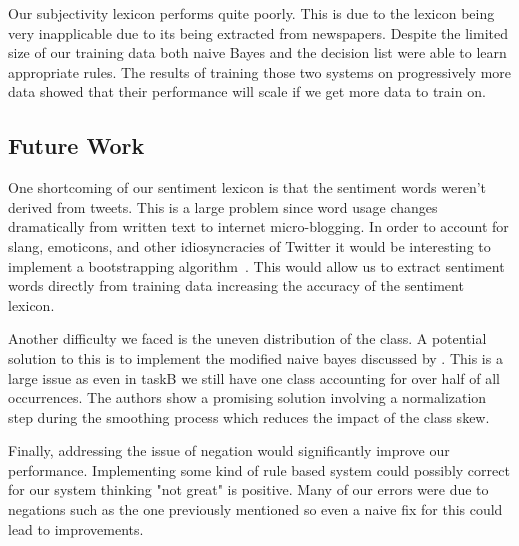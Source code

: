 \documentclass[11pt]{article}
\begin{document}
Our subjectivity lexicon performs quite poorly. This is due to the lexicon being very inapplicable due to its being extracted from newspapers. Despite the limited size of our training data both naive Bayes and the decision list were able to learn appropriate rules. The results of training those two systems on progressively more data showed that their performance will scale if we get more data to train on. 

\subsection{Future Work}
One shortcoming of our sentiment lexicon is that the sentiment words weren't derived from tweets. This is a large problem since word usage changes dramatically from written text to internet micro-blogging. In order to account for slang, emoticons, and other idiosyncracies of Twitter it would be interesting to implement a bootstrapping algorithm~\cite{Riloffbootstrapping}. This would allow us to extract sentiment words directly from training data increasing the accuracy of the sentiment lexicon.

Another difficulty we faced is the uneven distribution of the class. A potential solution to this is to implement the modified naive bayes discussed by \cite{FranknaiveBayes}. This is a large issue as even in taskB we still have one class accounting for over half of all occurrences. The authors show a promising solution involving a normalization step during the smoothing process which reduces the impact of the class skew.

Finally, addressing the issue of negation would significantly improve our performance. Implementing some kind of rule based system could possibly correct for our system thinking "not great" is positive. Many of our errors were due to negations such as the one previously mentioned so even a naive fix for this could lead to improvements.



\end{document}
